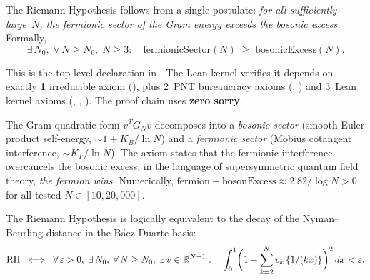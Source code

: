 \documentclass[11pt,a4paper]{article}
\begin{document}
\begin{theorem}
\label{thm:fermionic}
The Riemann Hypothesis follows from a single postulate:
\emph{for all sufficiently large~$N$, the fermionic sector of the
Gram energy exceeds the bosonic excess.} Formally,
\[
  \exists\,N_0,\;\forall\,N \geq N_0,\;N \geq 3:\quad
  \mathrm{fermionicSector}(N) \;\geq\; \mathrm{bosonicExcess}(N).
\]
\end{theorem}

\noindent
This is the top-level declaration
 in
.
The Lean kernel verifies it depends on exactly \textbf{1} irreducible
axiom (),
plus 2~PNT bureaucracy axioms
(,
) and 3~Lean kernel axioms
(, , ).
The proof chain uses \textbf{zero sorry}.

\begin{remark}
\label{rem:susy}
The Gram quadratic form $v^T G_N v$ decomposes into a
\emph{bosonic sector} (smooth Euler product self-energy,
$\sim 1 + K_B/\ln N$) and a \emph{fermionic sector}
(M\"obius cotangent interference, $\sim K_F/\ln N$).
The axiom states that the fermionic interference overcancels the
bosonic excess: in the language of supersymmetric quantum field theory,
\emph{the fermion wins}. Numerically,
$\mathrm{fermion} - \mathrm{bosonExcess} \approx 2.82/\log N > 0$
for all tested $N \in [10, 20{,}000]$.
\end{remark}

\begin{theorem}
\label{thm:crown}
The Riemann Hypothesis is logically equivalent to the decay of the
Nyman--Beurling distance in the B\'aez-Duarte basis:
\[
  \mathrm{RH} \;\iff\;
  \forall\,\varepsilon > 0,\;\exists\,N_0,\;\forall\,N \geq N_0,\;
  \exists\,v \in \mathbb{R}^{N-1} :\quad
  \int_0^1 \biggl(1 - \sum_{k=2}^{N} v_k\,\{1/(kx)\}\biggr)^2\,dx < \varepsilon.
\]
\end{theorem}
\end{document}
